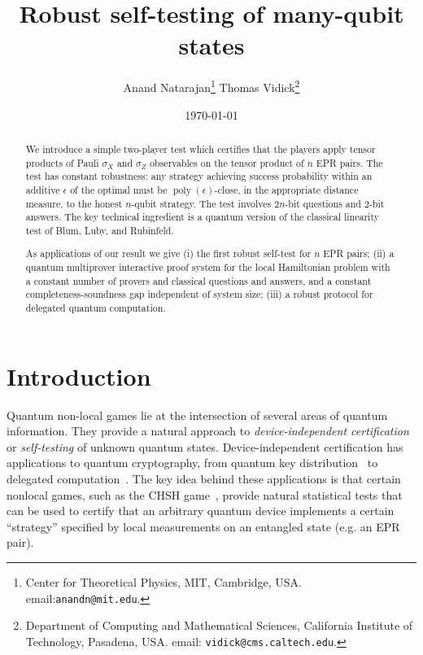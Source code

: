 \documentclass[11pt,letterpaper]{article}
\newcommand{\<}{\langle}
\renewcommand{\>}{\rangle}
\newcommand{\eps}{\epsilon}
\DeclareMathOperator{\poly}{poly}
\begin{document}
\title{Robust self-testing of many-qubit states}
\author{Anand Natarajan\thanks{Center for Theoretical Physics,
    MIT, Cambridge, USA. email:\texttt{anandn@mit.edu}. } \qquad Thomas
  Vidick\thanks{Department of Computing and Mathematical Sciences,
    California Institute of Technology, Pasadena, USA. email:
    \texttt{vidick@cms.caltech.edu}.}} 
\date{\today}
\maketitle


\begin{abstract}
  We introduce a simple two-player test which certifies that the players apply tensor products of Pauli $\sigma_X$ and
  $\sigma_Z$ observables on the tensor product of $n$ EPR pairs. The test has constant robustness: any strategy achieving success probability within an additive $\eps$ of the optimal must be $\poly(\eps)$-close, in the appropriate distance measure, to the honest $n$-qubit strategy. The test involves $2n$-bit questions and $2$-bit answers. 
		The  key technical ingredient is a quantum version of the classical
  linearity test of Blum, Luby, and Rubinfeld.

	As applications of our result we give (i) the first robust self-test for $n$ EPR pairs; (ii) a quantum multiprover interactive proof
  system for the local Hamiltonian problem with a constant number
  of provers and classical questions and answers, and a constant
  completeness-soundness gap independent of system size; (iii) a robust protocol for delegated quantum   computation.
\end{abstract}


\section{Introduction}

Quantum non-local games lie at the intersection of several areas of
quantum information. They provide a natural approach to
\emph{device-independent certification} or \emph{self-testing} of
unknown quantum states. Device-independent
certification has applications to quantum cryptography, from quantum
key distribution~\cite{VV14,MS14} to delegated
computation~\cite{ReichardtUV13nature,FitzsimonsH15}. The key idea
behind these applications is that certain nonlocal games, such as the
CHSH game~\cite{CHSH69}, provide natural statistical tests that can be
used to certify that an arbitrary quantum device implements a certain
``strategy'' specified by local measurements on an entangled state
(e.g. an EPR pair).
\end{document}
